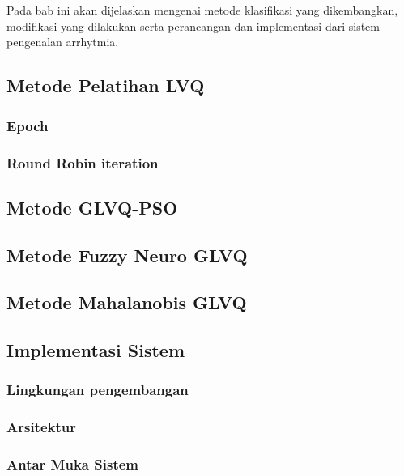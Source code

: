 \chapter{\babEmpat}
Pada bab ini akan dijelaskan mengenai metode klasifikasi yang dikembangkan,
modifikasi yang dilakukan serta perancangan dan implementasi dari sistem
pengenalan \gls{arrhytmia}. 

\section{Metode Pelatihan LVQ}
\subsection{Epoch}

\subsection{Round Robin iteration}


\section{Metode GLVQ-PSO}


\section{Metode Fuzzy Neuro GLVQ}


\section{Metode Mahalanobis GLVQ}


\section{Implementasi Sistem}
\subsection{Lingkungan pengembangan}

\subsection{Arsitektur}

\subsection{Antar Muka Sistem}
